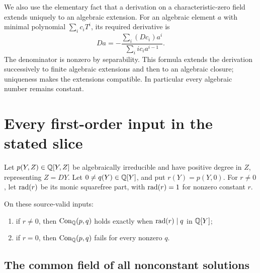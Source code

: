 \documentclass[11pt]{article}
\begin{document}
We also use the elementary fact that a derivation on a
characteristic-zero field extends uniquely to an algebraic extension.
For an algebraic element $a$ with minimal polynomial
$\sum_i c_iT^i$, its required derivative is
\[
 Da=-\frac{\sum_i(Dc_i)a^i}{\sum_i i c_i a^{i-1}}.
\]
The denominator is nonzero by separability. This formula extends the
derivation successively to finite algebraic extensions and then to
an algebraic closure; uniqueness makes the extensions compatible.
In particular every algebraic number remains constant.

\section{Every first-order input in the stated slice}

Let $p(Y,Z)\in\mathbb Q[Y,Z]$ be algebraically irreducible and have positive
degree in $Z$, representing $Z=DY$. Let $0\ne q(Y)\in\mathbb Q[Y]$, and
put $r(Y)=p(Y,0)$. For $r\ne0$, let $\operatorname{rad}(r)$ be its monic squarefree
part, with $\operatorname{rad}(r)=1$ for nonzero constant $r$.

\begin{theorem}\label{thm:orderone}
On these source-valid inputs:
\begin{enumerate}
\item if $r\ne0$, then $\operatorname{Con}_\mathbb Q(p,q)$ holds exactly when
      $\operatorname{rad}(r)\mid q$ in $\mathbb Q[Y]$;
\item if $r=0$, then $\operatorname{Con}_\mathbb Q(p,q)$ fails for every nonzero $q$.
\end{enumerate}
\end{theorem}

\subsection{The common field of all nonconstant solutions}
\end{document}
